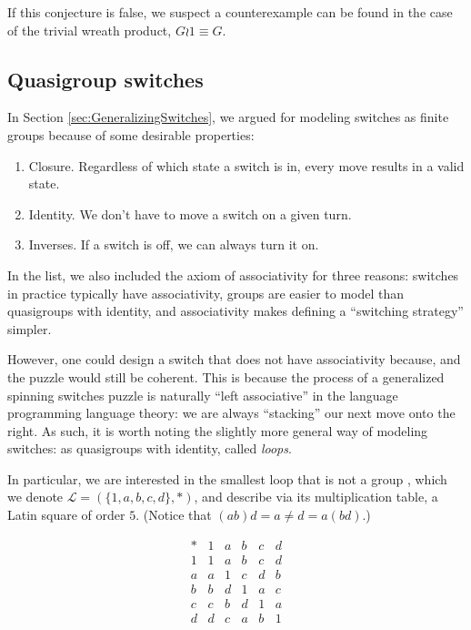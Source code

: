 If this conjecture is false, we suspect a counterexample can be found in the
case of the trivial wreath product, $G \wr \mathrm{1} \equiv G$.

\subsection{Quasigroup switches}
\label{sub:quasigroupSwitches}
In Section \ref{sec:GeneralizingSwitches}, we argued for modeling switches as
finite groups because of some desirable properties: \begin{enumerate}
  \item Closure. Regardless of which state a switch is in, every move results
    in a valid state.
  \item Identity. We don't have to move a switch on a given turn.
  \item Inverses. If a switch is off, we can always turn it on.
\end{enumerate}

In the list, we also included the axiom of associativity for three reasons:
switches in practice typically have associativity,
groups are easier to model than quasigroups with identity, and
associativity makes defining a ``switching strategy'' simpler.

However, one could design a switch that does not have associativity
because, and the puzzle would still be coherent. This is because the process of
a generalized spinning switches puzzle is naturally
``left associative'' in the language programming language theory:
we are always ``stacking'' our next move onto the right.
As such, it is worth noting the slightly more general way of modeling switches:
as quasigroups with identity, called \textit{loops}.

In particular, we are interested in the smallest loop that is not a group
\cite{MSELoop}, which we denote
$\mathcal{L} = (\{1, a, b, c, d\}, \ast)$,
and describe via its multiplication table, a Latin square of order $5$.
(Notice that $(ab)d = a \neq d = a(bd)$.)
\begin{singlespace}
\begin{equation}
  \begin{array}{c|ccccc}
    \ast & 1 & a & b & c & d \\
    \hline
      1 & 1 & a & b & c & d \\
      a & a & 1 & c & d & b \\
      b & b & d & 1 & a & c \\
      c & c & b & d & 1 & a \\
      d & d & c & a & b & 1
  \end{array}
\end{equation}
\end{singlespace}


